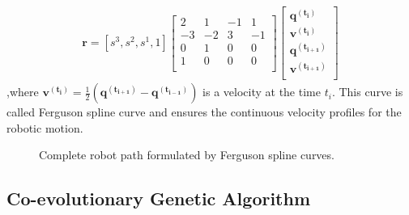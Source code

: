 \documentclass[12pt]{article} %
\begin{document}
\begin{eqnarray}
\bm{r} = 
\left[ s^3, s^2, s^1, 1\right] 
  \left[ 
   	\begin{array}{cccc}
      2 & 1  & -1 & 1  \\
     -3 & -2 & 3  & -1 \\
      0 & 1  & 0  & 0  \\
      1 & 0  & 0  & 0  \\
    \end{array}
  \right]
  \left[ 
   	\begin{array}{cccc}
      \bm{q^{(t_i)}} \\
      \bm{v^{(t_i)}} \\
      \bm{q^{(t_{i+1})}} \\
      \bm{v^{(t_{i+1})}} \\
    \end{array}
  \right]
\end{eqnarray}
,where $\bm{v^{(t_i)}} = \frac{1}{2} \left( \bm{q^{(t_{i+1})}} - \bm{q^{(t_{i-1})}} 
\right)$ is a velocity at the time $t_i$. This curve is called Ferguson spline curve and ensures the continuous velocity profiles for the robotic motion.

\begin{figure}[H] %
\caption{Complete robot path formulated by Ferguson spline curves.}
\label{fig:spline}
\end{figure}


\subsection{Co-evolutionary Genetic Algorithm} %
\end{document}
